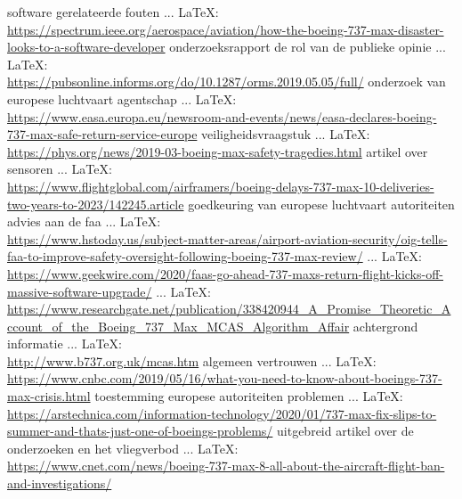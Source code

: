 \begin{thebibliography}{99}
software gerelateerde fouten
 ... \LaTeX:\\ \url{https://spectrum.ieee.org/aerospace/aviation/how-the-boeing-737-max-disaster-looks-to-a-software-developer}
onderzoeksrapport
de rol van de publieke opinie
 ... \LaTeX:\\ \url{https://pubsonline.informs.org/do/10.1287/orms.2019.05.05/full/}
onderzoek van europese luchtvaart agentschap
 ... \LaTeX:\\ \url{https://www.easa.europa.eu/newsroom-and-events/news/easa-declares-boeing-737-max-safe-return-service-europe}
veiligheidsvraagstuk
 ... \LaTeX:\\ \url{https://phys.org/news/2019-03-boeing-max-safety-tragedies.html}
artikel over sensoren
 ... \LaTeX:\\ \url{https://www.flightglobal.com/airframers/boeing-delays-737-max-10-deliveries-two-years-to-2023/142245.article}
goedkeuring van europese luchtvaart autoriteiten
advies aan de faa
 ... \LaTeX:\\ \url{https://www.hstoday.us/subject-matter-areas/airport-aviation-security/oig-tells-faa-to-improve-safety-oversight-following-boeing-737-max-review/}
 ... \LaTeX:\\ \url{https://www.geekwire.com/2020/faas-go-ahead-737-maxs-return-flight-kicks-off-massive-software-upgrade/}
 ... \LaTeX:\\ \url{https://www.researchgate.net/publication/338420944_A_Promise_Theoretic_Account_of_the_Boeing_737_Max_MCAS_Algorithm_Affair}
achtergrond informatie
 ... \LaTeX:\\ \url{http://www.b737.org.uk/mcas.htm}
algemeen vertrouwen
 ... \LaTeX:\\ \url{https://www.cnbc.com/2019/05/16/what-you-need-to-know-about-boeings-737-max-crisis.html}
toestemming europese autoriteiten
problemen
 ... \LaTeX:\\ \url{https://arstechnica.com/information-technology/2020/01/737-max-fix-slips-to-summer-and-thats-just-one-of-boeings-problems/}
uitgebreid artikel over de onderzoeken en het vliegverbod
 ... \LaTeX:\\ \url{https://www.cnet.com/news/boeing-737-max-8-all-about-the-aircraft-flight-ban-and-investigations/}

\end{thebibliography}
